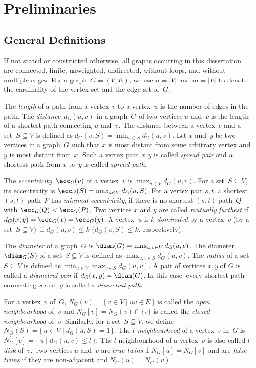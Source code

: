 \chapter{Preliminaries}
    \label{cha:prelim}
%

\section{General Definitions}
If not stated or constructed otherwise, all graphs occurring in this dissertation are connected, finite, unweighted, undirected, without loops, and without multiple edges.
For a graph~$G = (V, E)$, we use $n = |V|$ and $m = |E|$ to denote the cardinality of the vertex set and the edge set of~$G$.

The \emph{length} of a path from a vertex~$v$ to a vertex~$u$ is the number of edges in the path.
The \emph{distance}~$d_G(u, v)$ in a graph~$G$ of two vertices $u$ and~$v$ is the length of a shortest path connecting $u$ and~$v$.
The distance between a vertex~$v$ and a set~$S \subseteq V$ is defined as $d_G(v, S) = \min_{u \in S}  d_G(u, v)$.
Let $x$ and~$y$ be two vertices in a graph~$G$ such that $x$ is most distant from some arbitrary vertex and $y$ is most distant from~$x$.
Such a vertex pair~$x, y$ is called \emph{spread pair} and a shortest path from $x$ to~$y$ is called \emph{spread path}.

The \emph{eccentricity}~$\ecc_G(v)$ of a vertex~$v$ is $\max_{u \in V} d_G(u, v)$.
For a set~$S \subseteq V$, its eccentricity is $\ecc_G(S) = \max_{u \in V} d_G(u, S)$.
For a vertex pair $s,t$, a shortest $(s, t)$-path~$P$ has \emph{minimal eccentricity}, if there is no shortest $(s,t)$-path~$Q$ with $\ecc_G(Q) < \ecc_G(P)$.
Two vertices $x$ and $y$ are called \emph{mutually furthest} if $d_G(x,y) = \ecc_G(x) = \ecc_G(y)$.
A vertex~$u$ is \emph{$k$-dominated} by a vertex~$v$ (by a set~$S \subseteq V$), if $d_G(u, v) \leq k$ ($d_G(u, S) \leq k$, respectively).

The \emph{diameter} of a graph~$G$ is $\diam(G) = \max_{u,v \in V} d_G(u, v)$.
The diameter~$\diam_G(S)$ of a set~$S \subseteq V$ is defined as $\max_{u,v \in S} d_G(u, v)$.
The \emph{radius} of a set~$S \subseteq V$ is defined as $\min_{u \in V} \max_{v \in S} d_G(u, v)$.
A pair of vertices $x,y$ of $G$ is called a \emph{diametral  pair} if $d_G(x, y) = \diam(G)$.
In this case, every shortest path connecting $x$ and~$y$ is called a \emph{diametral path}.

For a vertex~$v$ of~$G$, $N_G(v) = \{ \, u \in V \mid uv \in E \, \}$ is called the \emph{open neighbourhood} of~$v$ and $N_G[v] = N_G(v) \cap \{ v \}$ is called the \emph{closed neighbourhood} of~$v$.
Similarly, for a set~$S \subseteq V$, we define $N_G(S) = \big \{ \, u \in V \mid d_G(u, S) = 1 \, \big \}$.
The \emph{\( l \)-neighbourhood} of a vertex~$v$ in~$G$ is $N_G^l[v] = \big \{ \, u \mid d_G(u, v) \leq l \, \big \}$.
The $l$-neighbourhood of a vertex~$v$ is also called \emph{\( l \)-disk} of~$v$.
Two vertices $u$ and~$v$ are \emph{true twins} if $N_G[u] = N_G[v]$ and are \emph{false twins} if they are non-adjacent and $N_G(u) = N_G(v)$.

